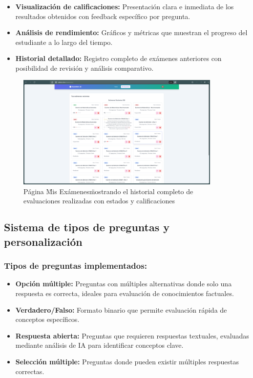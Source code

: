 \documentclass[12pt,a4paper]{report}
\begin{document}
\begin{itemize}
\item \textbf{Visualización de calificaciones:} Presentación clara e inmediata de los resultados obtenidos con feedback específico por pregunta.

\item \textbf{Análisis de rendimiento:} Gráficos y métricas que muestran el progreso del estudiante a lo largo del tiempo.

\item \textbf{Historial detallado:} Registro completo de exámenes anteriores con posibilidad de revisión y análisis comparativo.
\end{itemize}

\begin{figure}[h]
\centering
\includegraphics[width=0.9\textwidth]{assets/250617_06h46m40s_screenshot.png}
\caption{Página \"Mis Exámenes\" mostrando el historial completo de evaluaciones realizadas con estados y calificaciones}
\label{fig:mis-examenes}
\end{figure}

\subsection{Sistema de tipos de preguntas y personalización}

\subsubsection{Tipos de preguntas implementados:}

\begin{itemize}
\item \textbf{Opción múltiple:} Preguntas con múltiples alternativas donde solo una respuesta es correcta, ideales para evaluación de conocimientos factuales.
\item \textbf{Verdadero/Falso:} Formato binario que permite evaluación rápida de conceptos específicos.
\item \textbf{Respuesta abierta:} Preguntas que requieren respuestas textuales, evaluadas mediante análisis de IA para identificar conceptos clave.
\item \textbf{Selección múltiple:} Preguntas donde pueden existir múltiples respuestas correctas.
\end{itemize}
\end{document}
